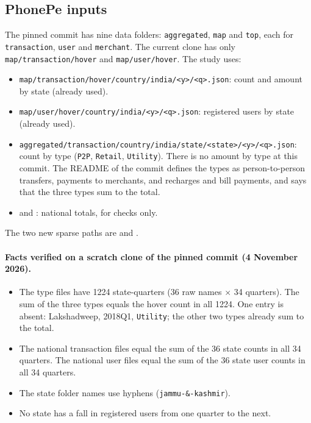 \documentclass[11pt,a4paper]{article}
\newcommand{\f}[1]{\texttt{#1}}
\begin{document}
\subsection{PhonePe inputs}\label{sec:types}
The pinned commit has nine data folders: \f{aggregated}, \f{map} and \f{top}, each for
\f{transaction}, \f{user} and \f{merchant}. The current clone has only \f{map/transaction/hover} and
\f{map/user/hover}. The study uses:
\begin{itemize}
  \item \f{map/transaction/hover/country/india/<y>/<q>.json}: count and amount by state (already used).
  \item \f{map/user/hover/country/india/<y>/<q>.json}: registered users by state (already used).
  \item \f{aggregated/transaction/country/india/state/<state>/<y>/<q>.json}: count by type
        (\f{P2P}, \f{Retail}, \f{Utility}). There is no amount by type at this commit. The README of the
        commit defines the types as person-to-person transfers, payments to merchants, and recharges and
        bill payments, and says that the three types sum to the total.
  \item {} and
        : national totals, for checks only.
\end{itemize}
The two new sparse paths are  and
.

\paragraph{Facts verified on a scratch clone of the pinned commit (4 November 2026).}
\begin{itemize}
  \item The type files have 1224 state-quarters (36 raw names $\times$ 34 quarters). The sum of the
        three types equals the hover count in all 1224. One entry is absent: Lakshadweep, 2018Q1,
        \f{Utility}; the other two types already sum to the total.
  \item The national transaction files equal the sum of the 36 state counts in all 34 quarters. The
        national user files equal the sum of the 36 state user counts in all 34 quarters.
  \item The state folder names use hyphens (\f{jammu-\&-kashmir}).
  \item No state has a fall in registered users from one quarter to the next.
\end{itemize}
\end{document}
